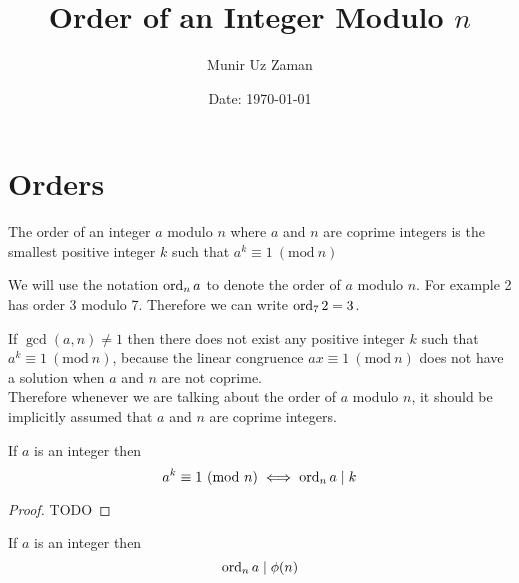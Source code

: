 \documentclass[11pt,numbers=noenddot,svgnames,dvipsnames]{scrartcl}
\title{Order of an Integer Modulo $n$}
\author{Munir Uz Zaman}
\date{Date: \today}
\renewcommand{\pmod}[1]{\ (\mathrm{mod}\ #1)}
\begin{document}
\maketitle

\section{Orders}

\begin{definition}
    The order of an integer $a$ modulo $n$ where $a$ and $n$ are coprime integers 
    is the smallest positive integer $k$ such that $a^{k} \equiv 1 \pmod{n}$
\end{definition}
We will use the notation $\operatorname{ord}_{n} a$ to denote the order of $a$ modulo $n$. 
For example 2 has order 3 modulo 7. Therefore we can write  $\operatorname{ord}_{7} 2 = 3$. 

\begin{remark}
    If $\gcd(a, n) \neq 1$ then there does not exist any positive integer $k$ such that 
    $a^{k} \equiv 1 \pmod n$, because the linear congruence $ax \equiv 1 \pmod n$ does not 
    have a solution when $a$ and $n$ are not coprime. \\
    Therefore whenever we are talking about the order of $a$ modulo $n$, 
    it should be implicitly assumed that $a$ and $n$ are coprime integers.
\end{remark}

\begin{theorem}
    If $a$ is an integer then 
    \[
        a^{k} \equiv 1 \pmod{n} \iff \ord_{n} a \mid k
    \]
\end{theorem}
\begin{proof}
    TODO
\end{proof}

\begin{corollary}
    If $a$ is an integer then 
    \[
        \operatorname{ord}_{n} a \mid \phi(n)
    \]
\end{corollary}
\end{document}
